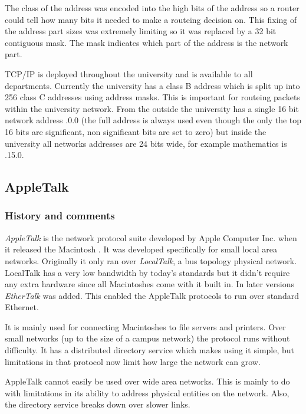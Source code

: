 The class of the address was encoded into the high bits of the address
so a router could tell how many bits it needed to make a routeing
decision on.  This fixing of the address part sizes was extremely
limiting so it was replaced by a 32 bit contiguous mask.  The mask
indicates which part of the address is the network part.

TCP/IP is deployed throughout the university and is available to all
departments.  Currently the university has a class B address which is
split up into 256 class C addresses using address masks.  This is
important for routeing packets within the university network.  From the
outside the university has a single 16 bit network address {.0.0} (the full address is always used even though the only the
top 16 bits are significant, non significant bits are set to zero) but
inside the university all networks addresses are 24 bits wide, for
example mathematics is {.15.0}.

\subsection{AppleTalk}
\label{network:appletalk}

\subsubsection{History and comments}

{\em AppleTalk} is the network protocol suite developed by Apple
Computer Inc. when it released the Macintosh \cite{AppleTalk:Apple}.
It was developed specifically for small local area networks.
Originally it only ran over {\em LocalTalk}, a bus topology physical
network.  LocalTalk has a very low bandwidth by today's standards but
it didn't require any extra hardware since all Macintoshes come with
it built in.  In later versions {\em EtherTalk} was added.  This
enabled the AppleTalk protocols to run over standard Ethernet.

It is mainly used for connecting Macintoshes to file servers and
printers.  Over small networks (up to the size of a campus network)
the protocol runs without difficulty.  It has a distributed directory
service which makes using it simple, but limitations in that protocol
now limit how large the network can grow.

AppleTalk cannot easily be used over wide area networks.  This is
mainly to do with limitations in its ability to address physical
entities on the network.  Also, the directory service breaks down over
slower links.

